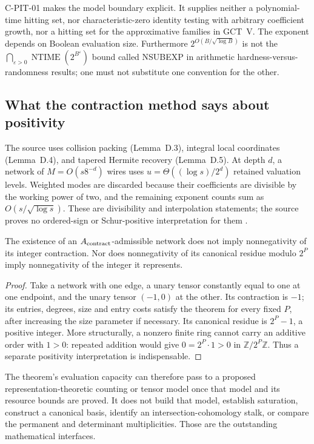 C-PIT-01 makes the model boundary explicit.  It supplies neither a
polynomial-time hitting set, nor characteristic-zero identity testing
with arbitrary coefficient growth, nor a hitting set for the
approximative families in GCT~V.  The exponent depends on Boolean
evaluation size.  Furthermore \(2^{O(B/\sqrt{\log B})}\) is not the
\(\bigcap_{\varepsilon>0}\operatorname{NTIME}(2^{B^\varepsilon})\)
bound called NSUBEXP in arithmetic hardness-versus-randomness results;
one must not substitute one convention for the other.

\subsection{What the contraction method says about positivity}

The source uses collision packing (Lemma~D.3), integral local
coordinates (Lemma~D.4), and tapered Hermite recovery (Lemma~D.5).
At depth \(d\), a network of \(M=O(s8^{-d})\) wires uses
\(u=\Theta((\log s)/2^d)\) retained valuation levels.  Weighted modes
are discarded because their coefficients are divisible by the
working power of two, and the remaining exponent counts sum as
\(O(s/\sqrt{\log s})\).  These are divisibility and interpolation
statements; the source proves no ordered-sign or Schur-positive
interpretation for them \cite[Appendix~D.4]{COAI26}.

\begin{proposition}
The existence of an \(A_{\rm contract}\)-admissible network does not
imply nonnegativity of its integer contraction.  Nor does nonnegativity
of its canonical residue modulo \(2^P\) imply nonnegativity of the
integer it represents.
\end{proposition}
\begin{proof}
Take a network with one edge, a unary tensor constantly equal to one
at one endpoint, and the unary tensor \((-1,0)\) at the other.  Its
contraction is \(-1\); its entries, degrees, size and entry costs
satisfy the theorem for every fixed \(P\), after increasing the
size parameter if necessary.  Its canonical residue is \(2^P-1\),
a positive integer.  More structurally, a nonzero finite ring cannot
carry an additive order with \(1>0\): repeated addition would give
\(0=2^P\cdot1>0\) in \(\mathbb Z/2^P\mathbb Z\).
Thus a separate positivity interpretation is indispensable.
\end{proof}

The theorem's evaluation capacity can therefore pass to a proposed
representation-theoretic counting or tensor model once that model and
its resource bounds are proved.  It does not build that model,
establish saturation, construct a canonical basis, identify an
intersection-cohomology stalk, or compare the permanent and
determinant multiplicities.  Those are the outstanding mathematical
interfaces.

